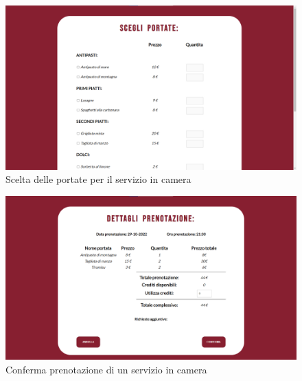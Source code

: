 \documentclass [a4paper, 12pt]{book}
\begin{document}
\begin{figure}[!h]
\centering
\includegraphics[scale=0.3]{ScegliPortateSC.png}
\caption{Scelta delle portate per il servizio in camera}
\label{ScegliPortateSC}
\end{figure}\newpage
\begin{figure}[!h]
\centering
\includegraphics[scale=0.3]{ConfermaPrenotazioneSC.png}
\caption{Conferma prenotazione di un servizio in camera}
\label{ConfermaPrenotazioneSC}
\end{figure}
\end{document}
